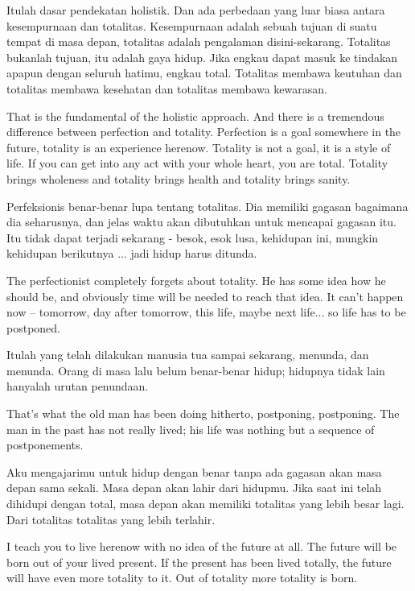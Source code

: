 \bahasa
Itulah dasar pendekatan holistik. Dan ada perbedaan yang luar biasa antara kesempurnaan dan totalitas. Kesempurnaan adalah sebuah tujuan di suatu tempat di masa depan, totalitas adalah pengalaman disini-sekarang. Totalitas bukanlah tujuan, itu adalah gaya hidup. Jika engkau dapat masuk ke tindakan apapun dengan seluruh hatimu, engkau total. Totalitas membawa keutuhan dan totalitas membawa kesehatan dan totalitas membawa kewarasan.

\english
That is the fundamental of the holistic approach. And there is a tremendous difference between perfection and totality. Perfection is a goal somewhere in the future, totality is an experience herenow. Totality is not a goal, it is a style of life. If you can get into any act with your whole heart, you are total. Totality brings wholeness and totality brings health and totality brings sanity.

\bahasa
Perfeksionis benar-benar lupa tentang totalitas. Dia memiliki gagasan bagaimana dia seharusnya, dan jelas waktu akan dibutuhkan untuk mencapai gagasan itu. Itu tidak dapat terjadi sekarang - besok, esok lusa, kehidupan ini, mungkin kehidupan berikutnya ... jadi hidup harus ditunda.

\english
The perfectionist completely forgets about totality. He has some idea how he should be, and obviously time will be needed to reach that idea. It can't happen now -- tomorrow, day after tomorrow, this life, maybe next life... so life has to be postponed.

\bahasa
Itulah yang telah dilakukan manusia tua sampai sekarang, menunda, dan menunda. Orang di masa lalu belum benar-benar hidup; hidupnya tidak lain hanyalah urutan penundaan.

\english
That's what the old man has been doing hitherto, postponing, postponing. The man in the past has not really lived; his life was nothing but a sequence of postponements.

\bahasa
Aku mengajarimu untuk hidup dengan benar tanpa ada gagasan akan masa depan sama sekali. Masa depan akan lahir dari hidupmu. Jika saat ini telah dihidupi dengan total, masa depan akan memiliki totalitas yang lebih besar lagi. Dari totalitas totalitas yang lebih terlahir.

\english
I teach you to live herenow with no idea of the future at all. The future will be born out of your lived present. If the present has been lived totally, the future will have even more totality to it. Out of totality more totality is born.

